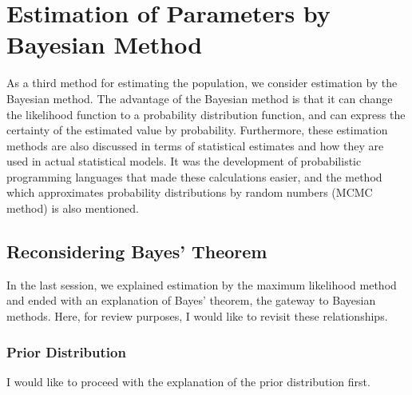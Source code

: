 \documentclass{ltjsarticle}
\begin{document}
\chapter{Estimation of Parameters by Bayesian Method}
\label{chapter25}
As a third method for estimating the population, we consider estimation by the Bayesian method. The advantage of the Bayesian method is that it can change the likelihood function to a probability distribution function, and can express the certainty of the estimated value by probability. Furthermore, these estimation methods are also discussed in terms of statistical estimates and how they are used in actual statistical models. It was the development of probabilistic programming languages that made these calculations easier, and the method which approximates probability distributions by random numbers (MCMC method) is also mentioned.
\section{Reconsidering Bayes' Theorem}
In the last session, we explained estimation by the maximum likelihood method and ended with an explanation of Bayes' theorem, the gateway to Bayesian methods. Here, for review purposes, I would like to revisit these relationships.

\subsection{Prior Distribution}
I would like to proceed with the explanation of the prior distribution first.
\end{document}
